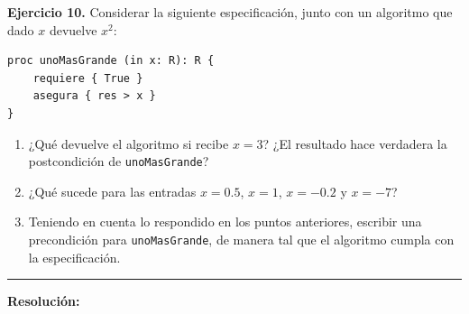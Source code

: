 \hypertarget{ej10}{}
\noindent \textbf{Ejercicio 10.} Considerar la siguiente especificación, junto con un algoritmo que dado $x$ devuelve $x^{2}$:

\begin{verbatim}
proc unoMasGrande (in x: R): R {
    requiere { True }
    asegura { res > x }
}
\end{verbatim}

\begin{enumerate}[label=\alph*)]
    \item ¿Qué devuelve el algoritmo si recibe $x=3$? ¿El resultado hace verdadera la postcondición de \texttt{unoMasGrande}?
    \item ¿Qué sucede para las entradas $x=0.5$, $x=1$, $x=-0.2$ y $x=-7$?
    \item Teniendo en cuenta lo respondido en los puntos anteriores, escribir una precondición para \texttt{unoMasGrande}, de manera tal que el algoritmo cumpla con la especificación.
\end{enumerate}

\vspace{0.2cm}
{\color{gray}\hrule}
\vspace{0.4cm}

\textbf{Resolución:}

